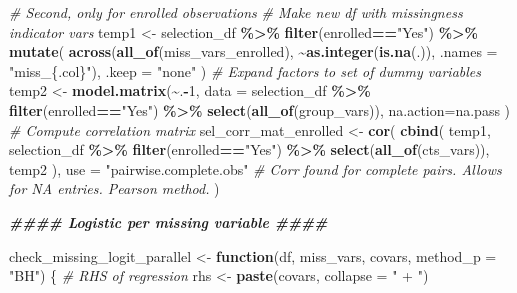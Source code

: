 \documentclass[
]{article}
\newenvironment{Shaded}{\begin{snugshade}}{\end{snugshade}}
\newcommand{\AttributeTok}[1]{\textcolor[rgb]{0.13,0.29,0.53}{#1}}
\newcommand{\CommentTok}[1]{\textcolor[rgb]{0.56,0.35,0.01}{\textit{#1}}}
\newcommand{\ControlFlowTok}[1]{\textcolor[rgb]{0.13,0.29,0.53}{\textbf{#1}}}
\newcommand{\DecValTok}[1]{\textcolor[rgb]{0.00,0.00,0.81}{#1}}
\newcommand{\DocumentationTok}[1]{\textcolor[rgb]{0.56,0.35,0.01}{\textbf{\textit{#1}}}}
\newcommand{\FunctionTok}[1]{\textcolor[rgb]{0.13,0.29,0.53}{\textbf{#1}}}
\newcommand{\NormalTok}[1]{#1}
\newcommand{\OtherTok}[1]{\textcolor[rgb]{0.56,0.35,0.01}{#1}}
\newcommand{\SpecialCharTok}[1]{\textcolor[rgb]{0.81,0.36,0.00}{\textbf{#1}}}
\newcommand{\StringTok}[1]{\textcolor[rgb]{0.31,0.60,0.02}{#1}}
\newcounter{none} %
\begin{document}
\begin{Shaded}
\begin{Highlighting}[]
\CommentTok{\# Second, only for enrolled observations}
\CommentTok{\# Make new df with missingness indicator vars}
\NormalTok{temp1 }\OtherTok{\textless{}{-}}\NormalTok{ selection\_df }\SpecialCharTok{\%\textgreater{}\%} 
  \FunctionTok{filter}\NormalTok{(enrolled}\SpecialCharTok{==}\StringTok{"Yes"}\NormalTok{) }\SpecialCharTok{\%\textgreater{}\%} 
  \FunctionTok{mutate}\NormalTok{(}
    \FunctionTok{across}\NormalTok{(}\FunctionTok{all\_of}\NormalTok{(miss\_vars\_enrolled), }
           \SpecialCharTok{\textasciitilde{}}\FunctionTok{as.integer}\NormalTok{(}\FunctionTok{is.na}\NormalTok{(.)),}
           \AttributeTok{.names =} \StringTok{"miss\_\{.col\}"}\NormalTok{),}
    \AttributeTok{.keep =} \StringTok{"none"}
\NormalTok{  )}
\CommentTok{\# Expand factors to set of dummy variables}
\NormalTok{temp2 }\OtherTok{\textless{}{-}} \FunctionTok{model.matrix}\NormalTok{(}\SpecialCharTok{\textasciitilde{}}\NormalTok{.}\SpecialCharTok{{-}}\DecValTok{1}\NormalTok{, }
                      \AttributeTok{data =}\NormalTok{ selection\_df }\SpecialCharTok{\%\textgreater{}\%} \FunctionTok{filter}\NormalTok{(enrolled}\SpecialCharTok{==}\StringTok{"Yes"}\NormalTok{) }\SpecialCharTok{\%\textgreater{}\%} \FunctionTok{select}\NormalTok{(}\FunctionTok{all\_of}\NormalTok{(group\_vars)),}
                      \AttributeTok{na.action=}\NormalTok{na.pass}
\NormalTok{                      )}
\CommentTok{\# Compute correlation matrix}
\NormalTok{sel\_corr\_mat\_enrolled }\OtherTok{\textless{}{-}} \FunctionTok{cor}\NormalTok{(}
  \FunctionTok{cbind}\NormalTok{(}
\NormalTok{    temp1, }
\NormalTok{    selection\_df }\SpecialCharTok{\%\textgreater{}\%} \FunctionTok{filter}\NormalTok{(enrolled}\SpecialCharTok{==}\StringTok{"Yes"}\NormalTok{) }\SpecialCharTok{\%\textgreater{}\%} \FunctionTok{select}\NormalTok{(}\FunctionTok{all\_of}\NormalTok{(cts\_vars)), }
\NormalTok{    temp2}
\NormalTok{    ),}
  \AttributeTok{use =} \StringTok{"pairwise.complete.obs"} \CommentTok{\# Corr found for complete pairs. Allows for NA entries. Pearson method.}
\NormalTok{)}

\DocumentationTok{\#\#\#\# Logistic per missing variable \#\#\#\#}

\NormalTok{check\_missing\_logit\_parallel }\OtherTok{\textless{}{-}} \ControlFlowTok{function}\NormalTok{(df, miss\_vars, covars, }\AttributeTok{method\_p =} \StringTok{"BH"}\NormalTok{) \{}
  \CommentTok{\# RHS of regression}
\NormalTok{  rhs }\OtherTok{\textless{}{-}} \FunctionTok{paste}\NormalTok{(covars, }\AttributeTok{collapse =} \StringTok{" + "}\NormalTok{) }
  

\end{Highlighting}
\end{Shaded}
\end{document}
